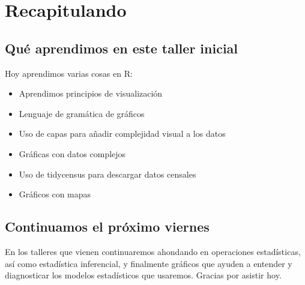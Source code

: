 \documentclass[
]{article}
\providecommand{\tightlist}{%
  \setlength{\itemsep}{0pt}\setlength{\parskip}{0pt}}
\begin{document}
\section{Recapitulando}\label{recapitulando}

\subsection{Qué aprendimos en este taller
inicial}\label{quuxe9-aprendimos-en-este-taller-inicial}

Hoy aprendimos varias cosas en R:

\begin{itemize}
\tightlist
\item
  Aprendimos principios de visualización
\item
  Lenguaje de gramática de gráficos
\item
  Uso de capas para añadir complejidad visual a los datos
\item
  Gráficas con datos complejos
\item
  Uso de tidycensus para descargar datos censales
\item
  Gráficos con mapas
\end{itemize}

\subsection{Continuamos el próximo
viernes}\label{continuamos-el-pruxf3ximo-viernes}

En los talleres que vienen continuaremos ahondando en operaciones
estadísticas, así como estadística inferencial, y finalmente gráficos
que ayuden a entender y diagnosticar los modelos estadísticos que
usaremos. Gracias por asistir hoy.
\end{document}

